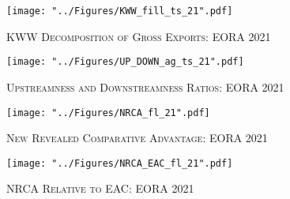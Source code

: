 \documentclass[a4paper]{article}
\begin{document}
\begin{figure}[h!]
\centering
\caption{\label{fig:KWW_fill_ts_21}\textsc{KWW Decomposition of Gross Exports: EORA 2021}}
\texttt{[image: "../Figures/KWW\_fill\_ts\_21".pdf]} %
\end{figure}
\FloatBarrier
 

\begin{figure}[h!] %
\centering
\caption{\label{fig:UP_DOWN_ag_ts_21}\textsc{Upstreamness and Downstreamness Ratios: EORA 2021}}
\texttt{[image: "../Figures/UP\_DOWN\_ag\_ts\_21".pdf]} %
\end{figure} 
\FloatBarrier 

\begin{figure}[h!]
\centering
\caption{\label{fig:NRCA_21}\textsc{New Revealed Comparative Advantage: EORA 2021}}
\texttt{[image: "../Figures/NRCA\_fl\_21".pdf]} %
\end{figure}
\FloatBarrier

\begin{figure}[h!]
\centering
\caption{\label{fig:NRCA_EAC_21}\textsc{NRCA Relative to EAC: EORA 2021}}
\texttt{[image: "../Figures/NRCA\_EAC\_fl\_21".pdf]} %
\vspace{-1cm}
\end{figure}
\FloatBarrier
\end{document}
